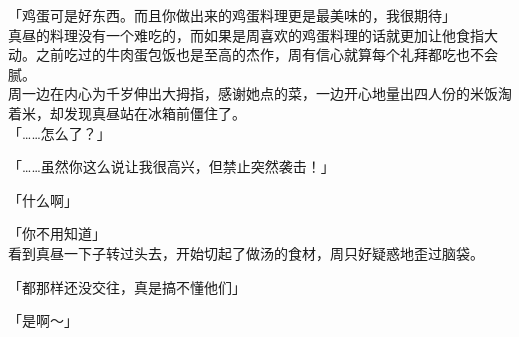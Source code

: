 「鸡蛋可是好东西。而且你做出来的鸡蛋料理更是最美味的，我很期待」\\

真昼的料理没有一个难吃的，而如果是周喜欢的鸡蛋料理的话就更加让他食指大动。之前吃过的牛肉蛋包饭也是至高的杰作，周有信心就算每个礼拜都吃也不会腻。\\

周一边在内心为千岁伸出大拇指，感谢她点的菜，一边开心地量出四人份的米饭淘着米，却发现真昼站在冰箱前僵住了。\\

「……怎么了？」

「……虽然你这么说让我很高兴，但禁止突然袭击！」

「什么啊」

「你不用知道」\\

看到真昼一下子转过头去，开始切起了做汤的食材，周只好疑惑地歪过脑袋。\\

\vspace{2\baselineskip}

「都那样还没交往，真是搞不懂他们」

「是啊～」
